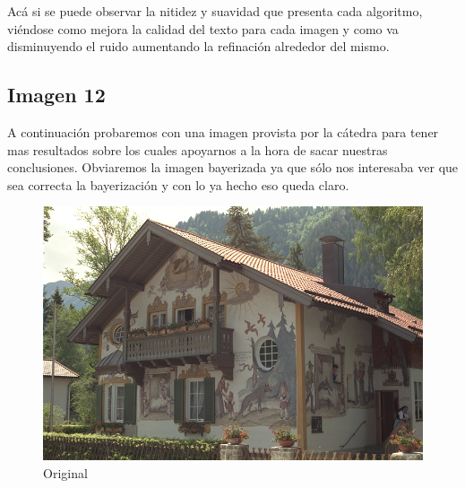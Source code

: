 {Acá si se puede observar la nitidez y suavidad que presenta cada algoritmo, viéndose como mejora la calidad del texto para cada imagen y como va disminuyendo el ruido aumentando la refinación alrededor del mismo.

\newpage

\subsection{Imagen 12}

A continuación probaremos con una imagen provista por la cátedra para tener mas resultados sobre los cuales apoyarnos a la hora de sacar nuestras conclusiones. Obviaremos la imagen bayerizada ya que sólo
nos interesaba ver que sea correcta la bayerización y con lo ya hecho eso queda claro.
\newpage
\begin{figure}
\begin{center}
       \includegraphics[scale=0.3]{imagenes/img12.png}
       \caption{Original }\label{fig:awesome_image1}
        \end{center}

\end{figure}

}
